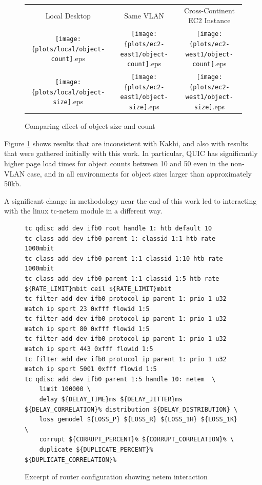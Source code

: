 \documentclass[12pt]{article}
\begin{document}
\begin{figure}[h]
\centering
\begin{tabular}{c c c}
	Local Desktop & Same VLAN & Cross-Continent EC2 Instance \\
	\texttt{[image: \{plots/local/object-count]}.eps} &
	\texttt{[image: \{plots/ec2-east1/object-count]}.eps} &
	\texttt{[image: \{plots/ec2-west1/object-count]}.eps} \\

	\texttt{[image: \{plots/local/object-size]}.eps} &
	\texttt{[image: \{plots/ec2-east1/object-size]}.eps} &
	\texttt{[image: \{plots/ec2-west1/object-size]}.eps} \\
\end{tabular}
\caption{Comparing effect of object size and count}
\label{figs:objects}
\end{figure}

Figure \ref{figs:objects} shows results that are inconsistent with Kakhi, and also with results that were gathered initially with this work. In particular, QUIC has significantly higher page load times for object counts between 10 and 50 even in the non-VLAN case, and in all environments for object sizes larger than approximately 50kb.

A significant change in methodology near the end of this work led to interacting with the linux tc-netem module in a different way.

\begin{figure}
\begin{lstlisting}[basicstyle=\tiny]
tc qdisc add dev ifb0 root handle 1: htb default 10
tc class add dev ifb0 parent 1: classid 1:1 htb rate 1000mbit
tc class add dev ifb0 parent 1:1 classid 1:10 htb rate 1000mbit
tc class add dev ifb0 parent 1:1 classid 1:5 htb rate ${RATE_LIMIT}mbit ceil ${RATE_LIMIT}mbit
tc filter add dev ifb0 protocol ip parent 1: prio 1 u32 match ip sport 23 0xfff flowid 1:5
tc filter add dev ifb0 protocol ip parent 1: prio 1 u32 match ip sport 80 0xfff flowid 1:5
tc filter add dev ifb0 protocol ip parent 1: prio 1 u32 match ip sport 443 0xfff flowid 1:5
tc filter add dev ifb0 protocol ip parent 1: prio 1 u32 match ip sport 5001 0xfff flowid 1:5
tc qdisc add dev ifb0 parent 1:5 handle 10: netem  \
	limit 100000 \
	delay ${DELAY_TIME}ms ${DELAY_JITTER}ms ${DELAY_CORRELATION}% distribution ${DELAY_DISTRIBUTION} \
	loss gemodel ${LOSS_P} ${LOSS_R} ${LOSS_1H} ${LOSS_1K} \
	corrupt ${CORRUPT_PERCENT}% ${CORRUPT_CORRELATION}% \
	duplicate ${DUPLICATE_PERCENT}% ${DUPLICATE_CORRELATION}%
\end{lstlisting}
\caption{Excerpt of router configuration showing netem interaction}
\label{figs:netem}
\end{figure}
\end{document}
